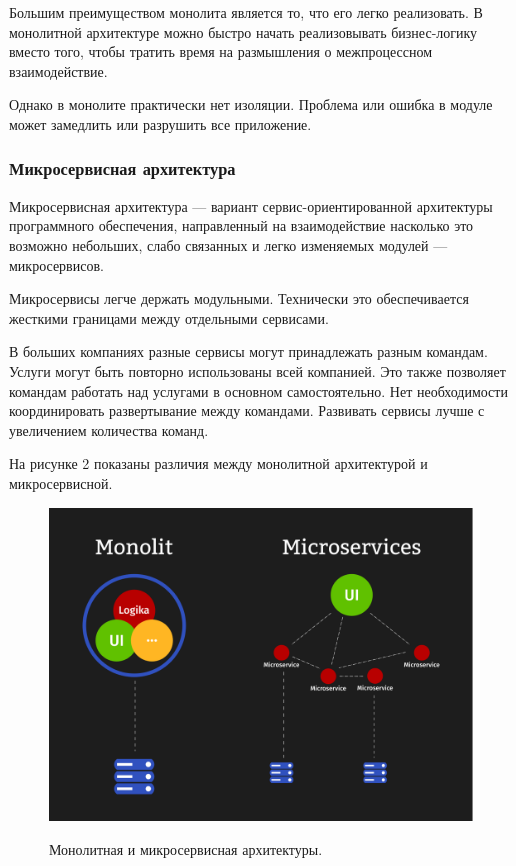 \documentclass[a4paper,14pt]{extarticle}
\begin{document}
 	Большим преимуществом монолита является то, что его легко реализовать. В монолитной архитектуре можно быстро начать реализовывать бизнес-логику вместо того, чтобы тратить время на размышления о межпроцессном взаимодействие.
 	
 	Однако в монолите практически нет изоляции. Проблема или ошибка в модуле может замедлить или разрушить все приложение.
 	
 	\subsubsection{Микросервисная архитектура}
 	
 	Микросервисная архитектура — вариант сервис-ориентированной архитектуры программного обеспечения, направленный на взаимодействие насколько это возможно небольших, слабо связанных и легко изменяемых модулей — микросервисов.
 	
 	Микросервисы легче держать модульными. Технически это обеспечивается жесткими границами между отдельными сервисами.
 	
 	В больших компаниях разные сервисы могут принадлежать разным командам. Услуги могут быть повторно использованы всей компанией. Это также позволяет командам работать над услугами в основном самостоятельно. Нет необходимости координировать развертывание между командами. Развивать сервисы лучше с увеличением количества команд.
 	
 	На рисунке 2 показаны различия между монолитной архитектурой и микросервисной.
 	
 	\begin{figure}[h!]
 		\begin{center}
 			{\includegraphics[scale = 0.5]{img/mono-micro.png}}
 			\label{ris:mono-micro}
 		\end{center}
 		\caption{Монолитная и микросервисная архитектуры.}
 	\end{figure}
 
\end{document}
